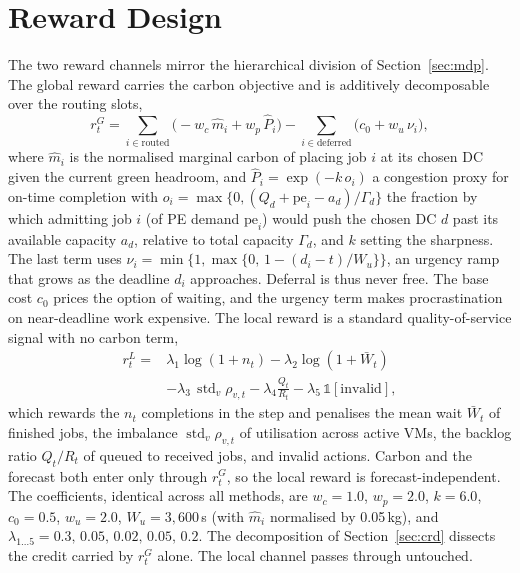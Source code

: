 \documentclass{article} %
\begin{document}
\section{Reward Design}
\label{app:reward}

The two reward channels mirror the hierarchical division of Section~\ref{sec:mdp}. The global reward carries the carbon objective and is additively decomposable over the routing slots,
\begin{equation}
r^{G}_t=\sum_{i\in\text{routed}}
\big(-w_c\,\hat{m}_i+w_p\,\hat{P}_i\big)
-\sum_{i\in\text{deferred}}\big(c_0+w_u\,\nu_i\big),
\label{eq:reward}
\end{equation}
where $\hat{m}_i$ is the normalised marginal carbon of placing job $i$ at its chosen DC given the current green headroom, and $\hat{P}_i=\exp(-k\,o_i)$ a congestion proxy for on-time completion with $o_i=\max\{0,(Q_d+\mathrm{pe}_i-a_d)/\Gamma_d\}$ the fraction by which admitting job $i$ (of PE demand $\mathrm{pe}_i$) would push the chosen DC $d$ past its available capacity $a_d$, relative to total capacity $\Gamma_d$, and $k$ setting the sharpness. The last term uses $\nu_i=\min\{1,\max\{0,\, 1-(d_i-t)/W_u\}\}$, an urgency ramp that grows as the deadline $d_i$ approaches. Deferral is thus never free. The base cost $c_0$ prices the option of waiting, and the urgency term makes procrastination on near-deadline work expensive. The local reward is a standard quality-of-service signal with no carbon term,
\begin{equation}
\begin{split}
r^{L}_t={} & \lambda_1\log(1{+}n_t)-\lambda_2\log(1{+}\bar{W}_t) \\
& -\lambda_3\,\operatorname{std}_v\rho_{v,t}-\lambda_4\frac{Q_t}{R_t}
-\lambda_5\,\mathds{1}[\text{invalid}],
\end{split}
\label{eq:localreward}
\end{equation}
which rewards the $n_t$ completions in the step and penalises the mean wait $\bar{W}_t$ of finished jobs, the imbalance $\operatorname{std}_v\rho_{v,t}$ of utilisation across active VMs, the backlog ratio $Q_t/R_t$ of queued to received jobs, and invalid actions. Carbon and the forecast both enter only through $r^{G}_t$, so the local reward is forecast-independent. The coefficients, identical across all methods, are $w_c{=}1.0$, $w_p{=}2.0$, $k{=}6.0$, $c_0{=}0.5$, $w_u{=}2.0$, $W_u{=}3{,}600$\,s (with $\hat m_i$ normalised by 0.05\,kg), and $\lambda_{1\ldots5}=0.3,\,0.05,\,0.02,\,0.05,\,0.2$. The decomposition of Section~\ref{sec:crd} dissects the credit carried by $r^{G}_t$ alone. The local channel passes through untouched.
\end{document}
